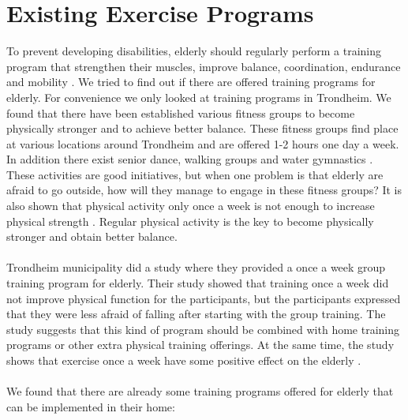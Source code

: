 \section{Existing Exercise Programs}
To prevent developing disabilities, elderly should regularly perform a training program that strengthen their muscles, improve balance, coordination, endurance and mobility \cite{gruppetrening-trheim}. We tried to find out if there are offered training programs for elderly. For convenience we only looked at training programs in Trondheim. We found that there have been established various fitness groups to become physically stronger and to achieve better balance. These fitness groups find place at various locations around Trondheim and are offered 1-2 hours one day a week. In addition there exist senior dance, walking groups and water gymnastics \cite{trim}. These activities are good initiatives, but when one problem is that elderly are afraid to go outside, how will they manage to engage in these fitness groups? It is also shown that physical activity only once a week is not enough to increase physical strength \cite{gruppetrening-trheim}. Regular physical activity is the key to become physically stronger and obtain better balance. \\ \\
Trondheim municipality did a study where they provided a once a week group training program for elderly. Their study showed that training once a week did not improve physical function for the participants, but the participants expressed that they were less afraid of falling after starting with the group training. The study suggests that this kind of program should be combined with home training programs or other extra physical training offerings. At the same time, the study shows that exercise once a week have some positive effect on the elderly \cite{gruppetrening-trheim}. \\ \\
We found that there are already some training programs offered for elderly that can be implemented in their home:\\ \\
